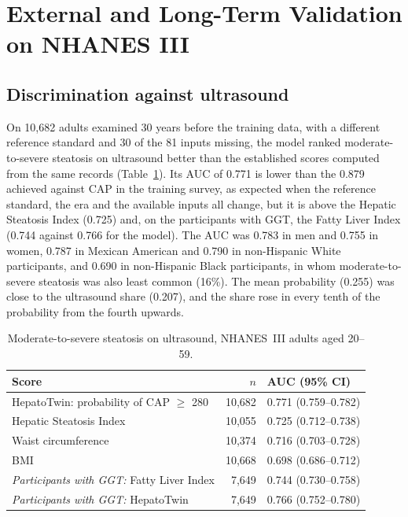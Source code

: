 \section{External and Long-Term Validation on NHANES III}
\label{sec:r_nhanes3}

\subsection{Discrimination against ultrasound}

On 10{,}682 adults examined 30 years before the training data, with a
different reference standard and 30 of the 81 inputs missing, the model ranked
moderate-to-severe steatosis on ultrasound better than the established scores
computed from the same records (Table~\ref{tab:r_nhanes3}). Its AUC of 0.771 is
lower than the 0.879 achieved against CAP in the training survey, as expected
when the reference standard, the era and the available inputs all change, but
it is above the Hepatic Steatosis Index (0.725) and, on the participants with
GGT, the Fatty Liver Index (0.744 against 0.766 for the model). The AUC was
0.783 in men and 0.755 in women, 0.787 in Mexican American and 0.790 in
non-Hispanic White participants, and 0.690 in non-Hispanic Black participants,
in whom moderate-to-severe steatosis was also least common (16\%). The mean
probability (0.255) was close to the ultrasound share (0.207), and the share
rose in every tenth of the probability from the fourth upwards.

\begin{table}[htbp]
\centering
\caption{Moderate-to-severe steatosis on ultrasound, NHANES~III adults aged 20--59.}
\label{tab:r_nhanes3}
\begin{tabular}{p{7cm}rp{3.5cm}}
\toprule
Score & $n$ & AUC (95\% CI) \\
\midrule
HepatoTwin: probability of CAP $\geq$ 280 & 10{,}682 & 0.771 (0.759--0.782) \\
Hepatic Steatosis Index & 10{,}055 & 0.725 (0.712--0.738) \\
Waist circumference & 10{,}374 & 0.716 (0.703--0.728) \\
BMI & 10{,}668 & 0.698 (0.686--0.712) \\
\midrule
\emph{Participants with GGT:} Fatty Liver Index & 7{,}649 & 0.744 (0.730--0.758) \\
\emph{Participants with GGT:} HepatoTwin & 7{,}649 & 0.766 (0.752--0.780) \\
\bottomrule
\end{tabular}
\end{table}

